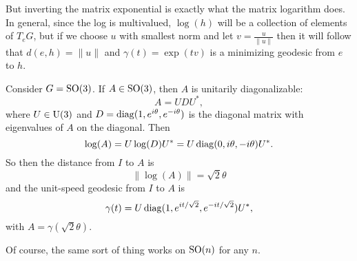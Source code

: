 But inverting the matrix exponential is exactly what the matrix logarithm does. In general, since the log is multivalued, $\log(h)$ will be a collection of elements of $T_eG$, but if we choose $u$ with smallest norm and let $v = \frac{u}{\|u\|}$ then it will follow that $d(e,h) = \|u\|$ and $\gamma(t) = \exp(tv)$ is a minimizing geodesic from $e$ to $h$.

\begin{example}
	Consider $G = \operatorname{SO}(3)$. If $A \in \operatorname{SO}(3)$, then $A$ is unitarily diagonalizable:
	\[
		A = U D U^\ast,
	\]
	where $U \in \operatorname{U}(3)$ and $D = \operatorname{diag}(1,e^{i\theta},e^{-i\theta})$ is the diagonal matrix with eigenvalues of $A$ on the diagonal. Then
	\[
		\log(A) = U \log(D) U^\ast = U \operatorname{diag}(0,i\theta,-i\theta) U^\ast.
	\]
	So then the distance from $I$ to $A$ is
	\[
		\|\log(A)\| = \sqrt{2}\theta
	\]
	and the unit-speed geodesic from $I$ to $A$ is
	\[
		\gamma(t) = U \operatorname{diag}(1,e^{it/\sqrt{2}},e^{-it/\sqrt{2}}) U^\ast,
	\]
	with $A = \gamma(\sqrt{2}\theta)$.
	
	Of course, the same sort of thing works on $\operatorname{SO}(n)$ for any $n$.
\end{example}


%
%
%
%

